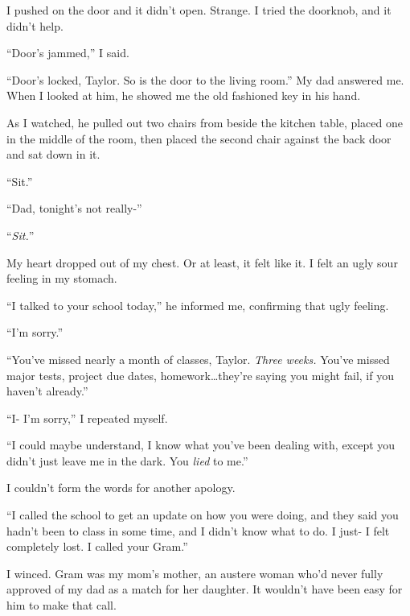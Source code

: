 I pushed on the door and it didn't open.  Strange.  I tried the doorknob, and it didn't help.



``Door's jammed,'' I said.



``Door's locked, Taylor.  So is the door to the living room.''  My dad answered me.  When I looked at him, he showed me the old fashioned key in his hand.



As I watched, he pulled out two chairs from beside the kitchen table, placed one in the middle of the room, then placed the second chair against the back door and sat down in it.



``Sit.''



``Dad, tonight's not really-''



``\emph{Sit.}''



My heart dropped out of my chest.  Or at least, it felt like it.  I felt an ugly sour feeling in my stomach.



``I talked to your school today,'' he informed me, confirming that ugly feeling.



``I'm sorry.''



``You've missed nearly a month of classes, Taylor.  \emph{Three weeks.  }You've missed major tests, project due dates, homework\ldots they're saying you might fail, if you haven't already.''



``I- I'm sorry,'' I repeated myself.



``I could maybe understand, I know what you've been dealing with, except you didn't just leave me in the dark.  You \emph{lied} to me.''



I couldn't form the words for another apology.



``I called the school to get an update on how you were doing, and they said you hadn't been to class in some time, and I didn't know what to do.  I just- I felt completely lost.  I called your Gram.''



I winced.  Gram was my mom's mother, an austere woman who'd never fully approved of my dad as a match for her daughter.  It wouldn't have been easy for him to make that call.



